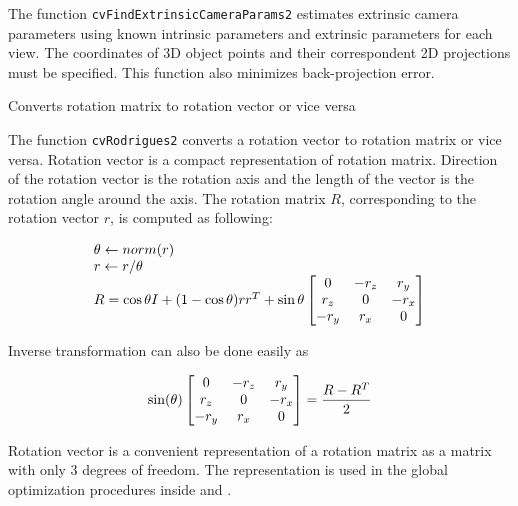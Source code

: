 The function \texttt{cvFindExtrinsicCameraParams2} estimates extrinsic camera parameters using known intrinsic parameters and extrinsic parameters for each view. The coordinates of 3D object points and their correspondent 2D projections must be specified. This function also minimizes back-projection error.


\label{Rodrigues2}

Converts rotation matrix to rotation vector or vice versa


\begin{description}
\end{description}

The function \texttt{cvRodrigues2} converts a rotation vector to rotation matrix or vice versa. Rotation vector is a compact representation of rotation matrix. Direction of the rotation vector is the rotation axis and the length of the vector is the rotation angle around the axis. The rotation matrix $R$, corresponding to the rotation vector $r$, is computed as following:

\[
\begin{array}{l}
\theta \leftarrow norm(r)\\
r \leftarrow r/\theta\\
R = \cos{\theta} I + (1-\cos{\theta}) r r^T + \sin{\theta}
\begin{bmatrix} 0 & -r_z & r_y\\ r_z & 0 & -r_x\\ -r_y & r_x & 0 \end{bmatrix}
\end{array}
\]

Inverse transformation can also be done easily as

\[
\sin(\theta)
\begin{bmatrix} 0 & -r_z & r_y\\ r_z & 0 & -r_x\\ -r_y & r_x & 0 \end{bmatrix}
=
\frac{R - R^T}{2}
\]

Rotation vector is a convenient representation of a rotation matrix
as a matrix with only 3 degrees of freedom. The representation is
used in the global optimization procedures inside
and .

